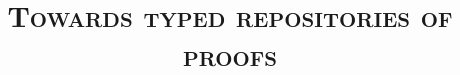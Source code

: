 \documentclass[professionalfonts,10pt,francais]{beamer}
\title{\textsc{Towards typed repositories of proofs}
\\
\textrm{}
}
\author{}
\date{}
\begin{document}
\maketitle

\begin{frame}
\frametitle{}
\end{frame}
\end{document}
